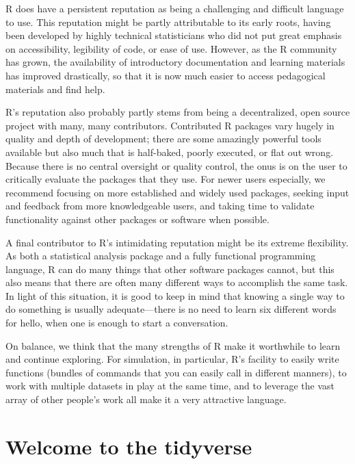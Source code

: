 \documentclass[
]{book}
\begin{document}
R does have a persistent reputation as being a challenging and difficult language to use.
This reputation might be partly attributable to its early roots, having been developed by highly technical statisticians who did not put great emphasis on accessibility, legibility of code, or ease of use.
However, as the R community has grown, the availability of introductory documentation and learning materials has improved drastically, so that it is now much easier to access pedagogical materials and find help.

R's reputation also probably partly stems from being a decentralized, open source project with many, many contributors.
Contributed R packages vary hugely in quality and depth of development; there are some amazingly powerful tools available but also much that is half-baked, poorly executed, or flat out wrong.
Because there is no central oversight or quality control, the onus is on the user to critically evaluate the packages that they use.
For newer users especially, we recommend focusing on more established and widely used packages, seeking input and feedback from more knowledgeable users, and taking time to validate functionality against other packages or software when possible.

A final contributor to R's intimidating reputation might be its extreme flexibility.
As both a statistical analysis package and a fully functional programming language, R can do many things that other software packages cannot, but this also means that there are often many different ways to accomplish the same task.
In light of this situation, it is good to keep in mind that knowing a single way to do something is usually adequate---there is no need to learn six different words for hello, when one is enough to start a conversation.

On balance, we think that the many strengths of R make it worthwhile to learn and continue exploring. For simulation, in particular, R's facility to easily write functions (bundles of commands that you can easily call in different manners), to work with multiple datasets in play at the same time, and to leverage the vast array of other people's work all make it a very attractive language.

\section{Welcome to the tidyverse}\label{welcome-to-the-tidyverse}
\end{document}
